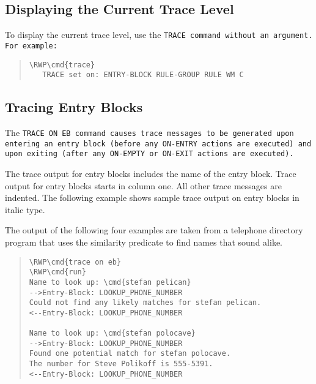 \subsection{Displaying the Current Trace Level}

To display the current trace level, use the \tt{TRACE} command without
an argument. For example:

\begin{quote}
\begin{Verbatim}[commandchars=\\\{\}]
\RWP\cmd{trace}
   TRACE set on: ENTRY-BLOCK RULE-GROUP RULE WM C
\end{Verbatim}
\end{quote}

\subsection{Tracing Entry Blocks}

The \tt{TRACE ON EB} command causes trace messages to be generated
upon entering an entry block (before any \tt{ON-ENTRY} actions are
executed) and upon exiting (after any \tt{ON-EMPTY} or \tt{ON-EXIT}
actions are executed).

The trace output for entry blocks includes the name of the entry
block. Trace output for entry blocks starts in column one. All
other trace messages are indented. The following example shows
sample trace output on entry blocks in italic type.

\begin{note}
  The output of the following four examples are taken from a telephone
  directory program that uses the similarity predicate to find names
  that sound alike.
\end{note}

\begin{quote}
\begin{Verbatim}[commandchars=\\\{\}]
\RWP\cmd{trace on eb}
\RWP\cmd{run}
Name to look up: \cmd{stefan pelican}
-->Entry-Block: LOOKUP_PHONE_NUMBER
Could not find any likely matches for stefan pelican.
<--Entry-Block: LOOKUP_PHONE_NUMBER

Name to look up: \cmd{stefan polocave}
-->Entry-Block: LOOKUP_PHONE_NUMBER
Found one potential match for stefan polocave.
The number for Steve Polikoff is 555-5391.
<--Entry-Block: LOOKUP_PHONE_NUMBER
\end{Verbatim}
\end{quote}


